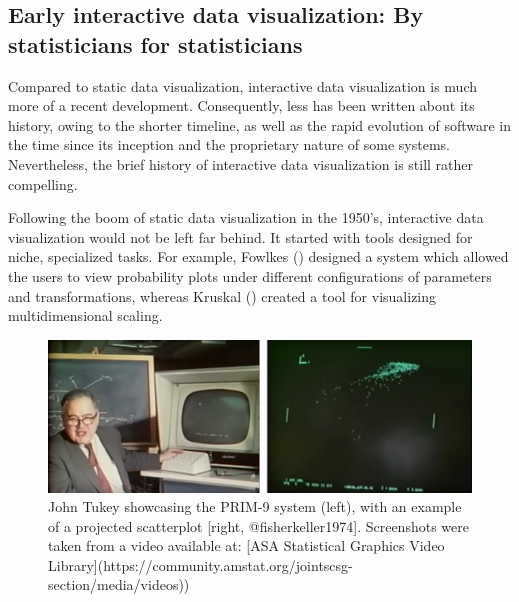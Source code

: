 \documentclass[
]{book}
\theoremstyle{definition}
\theoremstyle{definition}
\theoremstyle{definition}
\theoremstyle{definition}
\theoremstyle{remark}
\begin{document}
\subsection{Early interactive data visualization: By statisticians for statisticians}\label{early-interactive}

Compared to static data visualization, interactive data visualization is much more of a recent development. Consequently, less has been written about its history, owing to the shorter timeline, as well as the rapid evolution of software in the time since its inception and the proprietary nature of some systems. Nevertheless, the brief history of interactive data visualization is still rather compelling.

Following the boom of static data visualization in the 1950's, interactive data visualization would not be left far behind. It started with tools designed for niche, specialized tasks. For example, Fowlkes () designed a system which allowed the users to view probability plots under different configurations of parameters and transformations, whereas Kruskal () created a tool for visualizing multidimensional scaling.

\begin{figure}

{\centering \includegraphics[width=1\linewidth,height=1\textheight]{./figures/prim9} 

}

\caption{John Tukey showcasing the PRIM-9 system (left), with an example of a projected scatterplot [right, @fisherkeller1974]. Screenshots were taken from a video available at: [ASA Statistical Graphics Video Library](https://community.amstat.org/jointscsg-section/media/videos))}\label{fig:unnamed-chunk-5}
\end{figure}
\end{document}
